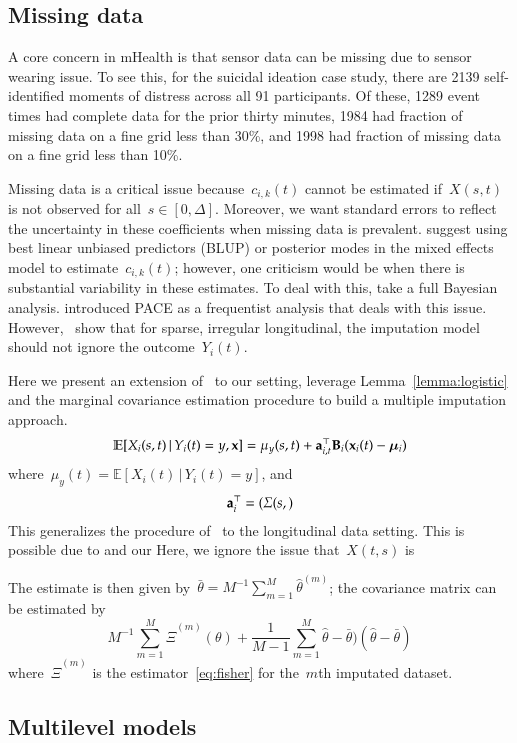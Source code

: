 \documentclass[12pt]{amsart}
\def\E{\mathcal{E}}
\def\E{\mathbb{E}}
\def\given{\, | \,}
\def\bfx{{\bf x}}
\begin{document}
\subsection{Missing data}
\label{section:missingdata}

A core concern in mHealth is that sensor data can be missing due to
sensor wearing issue.
To see this, for the suicidal ideation case study, there are 2139
self-identified moments of distress across all 91 participants.  Of
these, 1289 event times had complete data for the prior thirty minutes,
1984 had fraction of missing data on a fine grid less than 30\%, and
1998 had fraction of missing data on a fine grid less than 10\%. 

Missing data is a critical issue because~$c_{i,k} (t)$ cannot be
estimated if~$X(s,t)$ is not observed for all~$s \in [0,\Delta]$. 
Moreover, we want standard errors to reflect the uncertainty
in these coefficients when missing data is prevalent.
\cite{Goldsmith2015} suggest using best linear unbiased predictors
(BLUP) or posterior modes in the mixed effects model to
estimate~$c_{i,k} (t)$; however, one criticism would be when there is
substantial variability in these estimates.  To deal with this,
\cite{Crainiceanu2010, Goldsmith2010} take a full Bayesian analysis.
\cite{Yao2005} introduced PACE as a frequentist analysis that deals
with this issue.
However,~\cite{Reimherr2018} show that for sparse, irregular
longitudinal, the imputation model should not ignore the outcome~$Y_i
(t)$.

Here we present an extension of~\cite{Reimherr2018} to our setting,
leverage Lemma~\ref{lemma:logistic} and the marginal covariance
estimation procedure to build a multiple imputation approach.
\[
\E [ X_i (s,t) \given Y_i(t) = y, \bfx ] = \mu_y (s,t) + {\bf a}_{i,t}^\top
{\bf B}_i (\bfx_i (t) - \mathbold{\mu}_i )
\]
where~$\mu_y (t) = \E [ X_i (t) \given Y_i (t) = y]$, and
\[
{\bf a}_i^\top = ( \Sigma(s, )
\]
This generalizes the procedure of~\cite{Reimerr2018} to the
longitudinal data setting.
This is possible due to  and our 
Here, we ignore the issue that~$X(t,s)$ is 

The estimate is then given by~$\bar \theta = M^{-1} \sum_{m=1}^M \hat
\theta^{(m)}$; the covariance matrix can be estimated by
\[
M^{-1} \sum_{m=1}^M \hat \Xi^{(m)} (\theta) + \frac{1}{M-1}
\sum_{m=1}^M \hat \theta - \bar \theta) (\hat \theta - \bar \theta)
\]
where~$\hat \Xi^{(m)}$ is the estimator~\eqref{eq:fisher} for
the~$m$th imputated dataset.


\subsection{Multilevel models}
\end{document}
